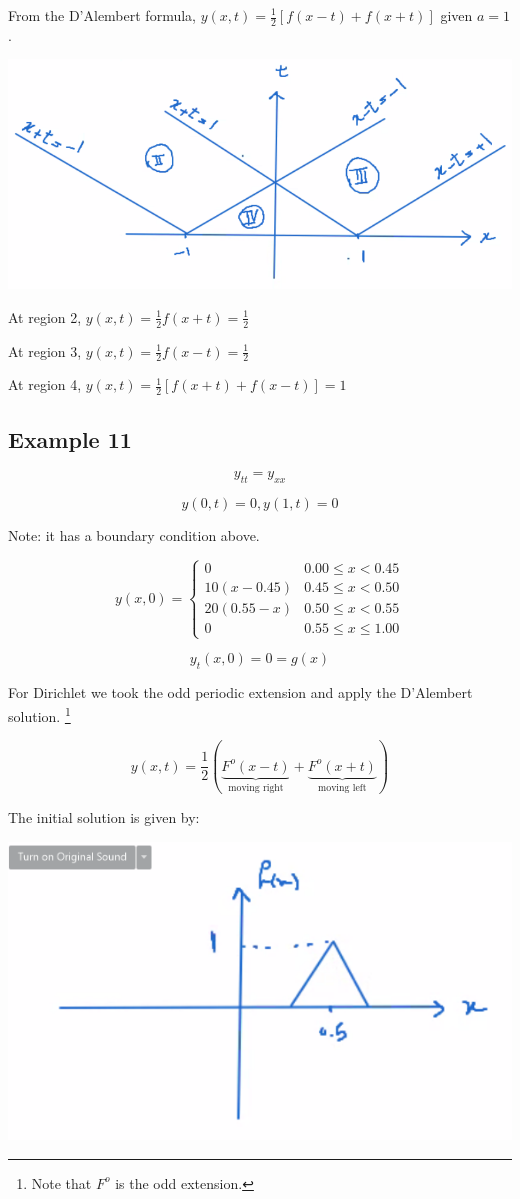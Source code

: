 \documentclass{article}
\begin{document}
From the D'Alembert formula, $y(x,t) = \frac{1}{2} \left[ f(x-t) + f(x+t) \right]$ given $a = 1$. 

\begin{center}
    \includegraphics[width = 0.7 \textwidth]{image5.png}


At region 2, $y(x,t) = \frac{1}{2} f(x+t) = \frac{1}{2}$

\hfill

At region 3, $y(x,t) = \frac{1}{2} f(x-t) = \frac{1}{2}$

\hfill

At region 4, $y(x,t) = \frac{1}{2} \left[ f(x+t) + f(x-t) \right] = 1$

\end{center}

\subsection{Example 11}

$$y_{tt} = y_{xx}$$

$$y(0,t) = 0, y(1,t) = 0$$

Note: it has a boundary condition above. 

$$y(x,0) = \left\{ \begin{matrix} 0 & 0.00 \leq x < 0.45\\ 
10(x-0.45) & 0.45 \leq x < 0.50\\ 
20(0.55-x) & 0.50 \leq x < 0.55\\ 
0 & 0.55 \leq x \leq 1.00 \end{matrix} \right.$$

$$y_t(x,0) = 0 = g(x)$$

For Dirichlet we took the odd periodic extension and apply the D'Alembert solution. \footnote{Note that $F^o$ is the odd extension. }

$$y(x,t) = \frac{1}{2} \left( \underbrace{F^o (x-t)}_{\text{moving right}} + \underbrace{F^o (x+t)}_{\text{moving left}} \right)$$

The initial solution is given by:

\includegraphics[width = 0.5 \textwidth]{image6.png}
\end{document}
